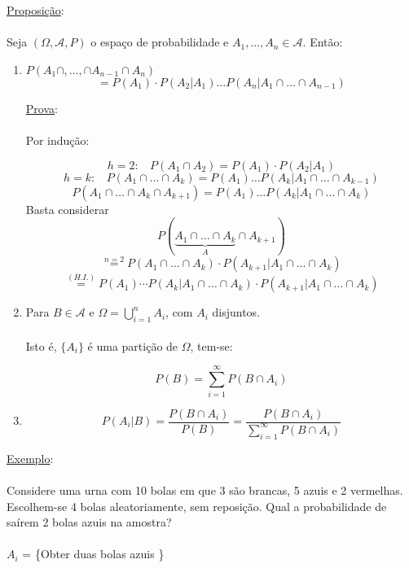 \documentclass[a4paper,12pt]{article}
\begin{document}
\newpage

\underline{Proposição}:\\
\\
Seja $(\Omega,\mathscr{A},P)$ o espaço de probabilidade e $A_1,\ldots,A_n\in \mathscr{A} $. Então:

\begin{enumerate}[label=\arabic*)]
	\item $P(A_1\cap,\ldots,\cap A_{n-1}\cap A_n) $\\
	$$=P(A_1)\cdot P(A_2|A_1)\ldots P(A_n|A_1\cap\ldots\cap A_{n-1}) $$
	
	\underline{Prova}:\\
	\\
	Por indução:
	
	$$h=2:\ \ \ \ P(A_1\cap A_2)=P(A_1)\cdot P(A_2|A_1) $$
	$$h=k: \ \ \ \ P(A_1\cap \ldots \cap A_k) = P(A_1)\ldots P(A_k|A_1\cap \ldots \cap A_{k-1}) $$
		$$P(A_1\cap \ldots \cap A_k\cap A_{k+1}) = P(A_1)\ldots P(A_k|A_1\cap \ldots \cap A_{k}) $$
		Basta considerar 
		$$P(\underbrace{A_1\cap \ldots \cap A_k}_{A}\cap A_{k+1})  $$
		$$\overset{n=2}{=} P(A_1\cap \ldots \cap A_k)\cdot P(A_{k+1}|A_1\cap \ldots \cap A_k) $$
			$$\overset{(H.I.)}{=} P(A_1)\cdots P(A_k|A_1\cap \ldots \cap A_k)\cdot P(A_{k+1}|A_1\cap \ldots \cap A_k) $$
		
	
	\item Para $B\in \mathscr{A}$ e $\Omega=\bigcup\limits_{i=1}^n A_i$, com $A_i$ disjuntos.\\
	\\
	Isto é, $ \{A_i \}$ é uma partição  de $\Omega$, tem-se:
	
	
	$$P(B) = \sum\limits_{i=1}^{\infty} P(B\cap A_i) $$
	
	\item $$P(A_i|B)=\frac{P(B\cap A_i)}{P(B)} = \frac{P(B\cap A_i)}{\sum\limits_{i=1}^{\infty}P(B\cap A_i)} $$
	


\end{enumerate}


\newpage
\underline{Exemplo}:\\
\\
Considere uma urna com 10 bolas em que 3 são brancas, 5 azuis e 2 vermelhas.\\
Escolhem-se 4 bolas aleatoriamente, sem reposição. Qual a probabilidade de saírem 2 bolas azuis na amostra?\\
\\
$A_i$ = \{Obter duas bolas azuis \}\\
\end{document}
